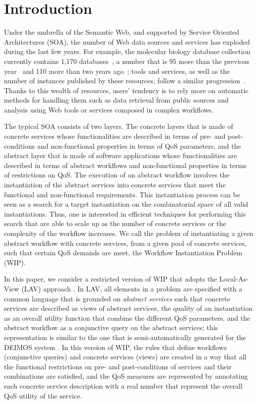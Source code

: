 \documentclass{llncs}
\begin{document}
\section{Introduction}

Under the umbrella of the Semantic Web, and supported by Service Oriented
Architectures (SOA), the number of Web data sources and services has exploded
during the last few years. For example, the molecular biology database
collection currently contains 1,170 databases~\cite{Galperin09}, a number
that is 95 more than the previous year~\cite{Galperin2008} and 110 more
than two years ago~\cite{Galperin2007}; tools and services, as well as the
number of instances published by these resources, follow a similar
progression~\cite{Benson07}. Thanks to this wealth of resources, users'
tendency is to rely more on automatic methods for handling them such as
data retrieval from public sources and analysis using Web
tools or services composed in complex workflows.

The typical SOA consists of two layers. The concrete layers that is
made of concrete services whose functionalities are described in
terms of pre- and post-conditions and non-functional properties in
terms of QoS parameters, and the abstract layer that is made of 
software applications whose functionalities are described in terms
of abstract workflows and non-functional properties in terms of
restrictions on QoS.
The execution of an abstract workflow involves the instantiation
of the abstract services into concrete services that meet the
functional and non-functional requirements. This instantiation
process can be seen as a search for a target instantiation on
the combinatorial space of all valid instantiations.
Thus, one is interested in efficient techniques for performing
this search that are able to scale up as the number of concrete
services or the complexity of the workflow increases.
We call the problem of instantiating a given abstract workflow
with concrete services, from a given pool of concrete services,
such that certain QoS demands are meet, the Workflow Instantiation
Problem (WIP).

In this paper, we consider a restricted version of WIP that adopts
the Local-As-View (LAV) approach \cite{levy:bucket}.
In LAV, all elements in a problem are specified with a common language
that is grounded on \emph{abstract services} such that concrete
services are described as views of abstract services, the quality
of an instantiation as an overall utility function that combine the
different QoS parameters, and the abstract workflow as a conjunctive
query on the abstract services; this representation is similar to the
one that is semi-automatically generated for the DEIMOS system
\cite{AmbiteISWC09}.
In this version of WIP, the rules that define workflows (conjunctive queries)
and concrete services (views) are created in a way that all the 
functional restrictions on pre- and post-conditions of services
and their combinations are satisfied, and the QoS measures are
represented by annotating each concrete service description with
a real number that represent the overall QoS utility of the service.
\end{document}
